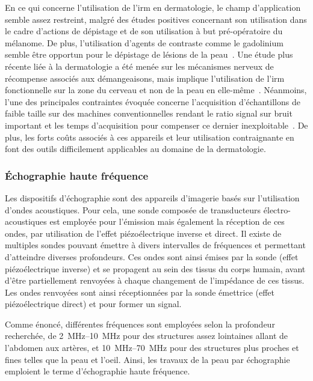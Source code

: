 En ce qui concerne l'utilisation de l'\gls{irm} en dermatologie, le champ d'application semble assez restreint, malgré des études positives concernant son utilisation dans le cadre d'actions de dépistage et de son utilisation à but pré-opératoire du mélanome. De plus, l'utilisation d'agents de contraste comme le gadolinium semble être opportun pour le dépistage de lésions de la peau~\cite{Zemtsov1993}. Une étude plus récente liée à la dermatologie a été menée sur les mécanismes nerveux de récompense associés aux démangeaisons, mais implique l'utilisation de l'\gls{irm} fonctionnelle sur la zone du cerveau et non de la peau en elle-même~\cite{Mueller2017}. Néanmoins, l'une des principales contraintes évoquée concerne l'acquisition d'échantillons de faible taille sur des machines conventionnelles rendant le ratio signal sur bruit important et les temps d'acquisition pour compenser ce dernier inexploitable~\cite{Gobel2016}. De plus, les forts coûts associés à ces appareils et leur utilisation contraignante en font des outils difficilement applicables au domaine de la dermatologie.\par

\subsubsection{Échographie haute fréquence}
Les dispositifs d'échographie sont des appareils d'imagerie basés sur l'utilisation d'ondes acoustiques. Pour cela, une sonde composée de transducteurs électro-acoustiques est employée pour l'émission mais également la réception de ces ondes, par utilisation de l'effet piézoélectrique inverse et direct. Il existe de multiples sondes pouvant émettre à divers intervalles de fréquences et permettant d'atteindre diverses profondeurs. Ces ondes sont ainsi émises par la sonde (effet piézoélectrique inverse) et se propagent au sein des tissus du corps humain, avant d'être partiellement renvoyées à chaque changement de l'impédance de ces tissus. Les ondes renvoyées sont ainsi réceptionnées par la sonde émettrice (effet piézoélectrique direct) et pour former un signal.\par

Comme énoncé, différentes fréquences sont employées selon la profondeur recherchée, de \SIrange{2}{10}{\mega\hertz} pour des structures assez lointaines allant de l'abdomen aux artères, et \SIrange{10}{70}{\mega\hertz} pour des structures plus proches et fines telles que la peau et l'oeil. Ainsi, les travaux de la peau par échographie emploient le terme d'échographie haute fréquence.\par

